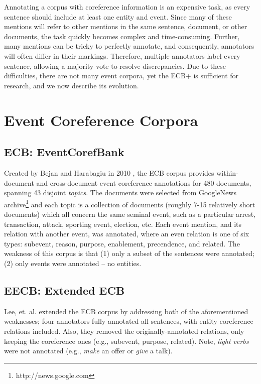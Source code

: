 \label{sec:corpus}
Annotating a corpus with coreference information is an expensive task, as every sentence should include at least one entity and event.  Since many of these mentions will refer to other mentions in the same sentence, document, or other documents, the task quickly becomes complex and time-consuming.  Further, many mentions can be tricky to perfectly annotate, and consequently, annotators will often differ in their markings.  Therefore, multiple annotators label every sentence, allowing a majority vote to resolve discrepancies.  Due to these difficulties, there are not many event corpora, yet the ECB+ is sufficient for research, and we now describe its evolution.

\section{Event Coreference Corpora}
\subsection{ECB: EventCorefBank}
Created by Bejan and Harabagiu in 2010 \cite{Bejan:2010:UEC:1858681.1858824}, the ECB corpus provides within-document and cross-document event coreference annotations for 480 documents, spanning 43 disjoint \textit{topics}.  The documents were selected from GoogleNews archive\footnote{http://news.google.com} and each topic is a collection of documents (roughly 7-15 relatively short documents) which all concern the same seminal event, such as a particular arrest, transaction, attack, sporting event, election, etc.  Each event mention, and its relation with another event, was annotated, where an even relation is one of six types: subevent, reason, purpose, enablement, precendence, and related.  The weakness of this corpus is that (1) only a subset of the sentences were annotated; (2) only events were annotated -- no entities.

\subsection{EECB: Extended ECB}
Lee, et. al. \cite{Lee:2012:JEE:2390948.2391006} extended the ECB corpus by addressing both of the aforementioned weaknesses; four annotators fully annotated all sentences, with entity coreference relations included.  Also, they removed the originally-annotated relations, only keeping the coreference ones (e.g., subevent, purpose, related).  Note, \textit{light verbs} were not annotated (e.g., \textit{make} an offer or \textit{give} a talk).

